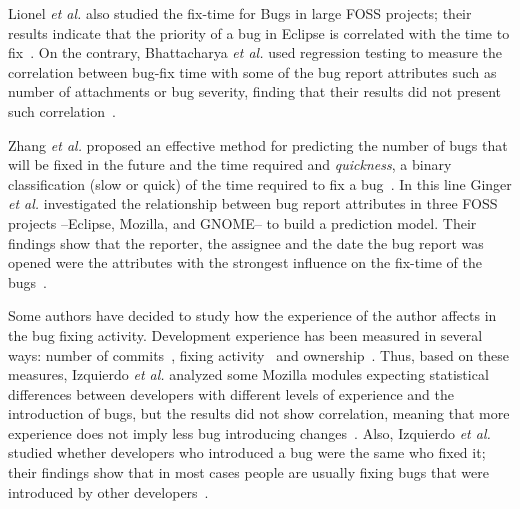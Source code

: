 \documentclass[10pt, conference]{IEEEtran}
\begin{document}
Lionel \emph{et al.} also studied the fix-time for Bugs in large FOSS projects; their results indicate that the priority of a bug in Eclipse is correlated with the time to fix~\cite{marks2011studying}. On the contrary, Bhattacharya \emph{et al.} used regression testing to measure the correlation between bug-fix time with some of the bug report attributes such as number of attachments or bug severity, finding that their results did not present such correlation~\cite{bhattacharya2011bug}.



Zhang \emph{et al.} proposed an effective method for predicting the number of bugs that will be fixed in the future and the time required and \emph{quickness}, a binary classification (slow or quick) of the time required to fix a bug~\cite{zhang2013predicting}. In this line Ginger \emph{et al.} investigated the relationship between bug report attributes in three FOSS projects --Eclipse, Mozilla, and GNOME-- to build a prediction model. Their findings show that the reporter, the assignee and the date the bug report was opened were the attributes with the strongest influence on the fix-time of the bugs~\cite{giger2010predicting}.


Some authors have decided to study how the experience of the author affects in the bug fixing activity. Development experience has been measured in several ways: number of commits~\cite{eyolfson2011time}, fixing activity~\cite{ahsan2010mining} and ownership~\cite{german2004using}. Thus, based on these measures, Izquierdo \emph{et al.} analyzed some Mozilla modules expecting statistical differences between developers with different levels of experience and the introduction of bugs, but the results did not show correlation, meaning that more experience does not imply less bug introducing changes~\cite{izquierdo2012more}. Also, Izquierdo \emph{et al.} studied whether developers who introduced a bug were the same who fixed it; their findings show that in most cases people are usually fixing bugs that were introduced by other developers~\cite{izquierdo2011developers}.
\end{document}
